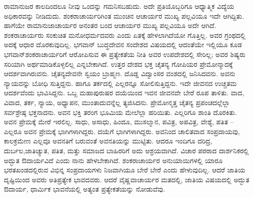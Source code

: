ರಾಮಾನುಜರ ಕಾಲದಿಂದಲೂ ನೀವು ಒಂದನ್ನು ಗಮನಿಸಬಹುದು. ಅದೇ ಪ್ರತಿಯೊಬ್ಬರಿಗೂ ಆಧ್ಯಾತ್ಮಿಕ ವಿದ್ಯೆಯ ಅಧಿಕಾರವನ್ನು ನೀಡಿದುದು. ಶಂಕರಾಚಾರ್ಯರಿಗಿಂತ ಮುಂಚಿನ ಆಚಾರ್ಯರ ಮುಖ್ಯ ಪಲ್ಲವಿಯೂ ಇದೇ ಆಗಿದ್ದಿತು. ಹಾಗೆಯೇ ರಾಮಾನುಜಾಚಾರ್ಯರ ಅನಂತರ ಬಂದ ಆಚಾರ್ಯರ ಮುಖ್ಯ ಪಲ್ಲವಿಯೂ ಅದೇ ಆಗಿದೆ. ಶಂಕರಾಚಾರ್ಯರು ಸಂಕುಚಿತ ಮನೋಧರ್ಮದವರು ಎಂದು ಏತಕ್ಕೆ ಹೇಳಲಾಗಿದೆಯೋ ಗೊತ್ತಿಲ್ಲ. ಅವರ ಗ್ರಂಥದಲ್ಲಿ ಅದಕ್ಕೆ ಆಧಾರ ದೊರಕುವುದಿಲ್ಲ. ಭಗವಾನ್​ ಬುದ್ಧದೇವನ ಸಂದೇಶದ ವಿಷಯದಲ್ಲಿ ಆದಂತೆಯೇ ಇಲ್ಲಿಯೂ ಕೂಡ ಭಗವಾನ್​ ಶಂಕರಾಚಾರ್ಯರಿಗೆ ಆರೋಪಿಸುವ ಈ ಪ್ರತ್ಯೇಕತೆಯ ನೀತಿ ಅವರ ಉಪದೇಶದಲ್ಲಿ ಸೇರಿಲ್ಲ; ಅವರ ಶಿಷ್ಯರು ಸರಿಯಾಗಿ ಅರ್ಥಮಾಡಿಕೊಳ್ಳಲಿಲ್ಲ ಎನ್ನಬೇಕಾಗಿದೆ. ಉತ್ತರ ದೇಶದ ಭಕ್ತ ಚೈತನ್ಯ ಗೋಪಿಯರ ಪ್ರೇಮೋನ್ಮಾದಕ್ಕೆ ಆದರ್ಶವಾಗಿರುವನು. ಚೈತನ್ಯದೇವನೇ ಸ್ವಯಂ ಬ್ರಾಹ್ಮಣ. ದೊಡ್ಡ ವಿದ್ವಾಂಸರ ವಂಶದಲ್ಲಿ ಜನಿಸಿದವನು. ಅವನು ನ್ಯಾಯವನ್ನು ಬೋಧಿ ಸುತ್ತಿದ್ದನು. ಹಾಗೂ ತರ್ಕದಲ್ಲಿ ಎಲ್ಲರನ್ನೂ ಸೋಲಿಸುತ್ತಿದ್ದನು. ಇದೇ ಜೀವನದ ಉಚ್ಚತಮ ಆದರ್ಶವೆಂದು ಭಾವಿಸಿದ್ದನು. ಒಬ್ಬ ಮಹಾಪುರುಷರ ದಯೆಯಿಂದ ಇವನ ಜೀವನವೇ ಬೇರೆ ರೂಪ ತಾಳಿತು. ವಾದ, ವಿವಾದ, ತರ್ಕ, ನ್ಯಾಯ, ಅಧ್ಯಾಪನ, ಮುಂತಾದುವನ್ನೆಲ್ಲ ತ್ಯಜಿಸಿದನು. ಪ್ರೇಮೋನ್ಮತ್ತ ಚೈತನ್ಯ ಪ್ರಪಂಚದಲ್ಲೆಲ್ಲಾ ಸರ್ವಶ್ರೇಷ್ಠ ಭಕ್ತನಾದನು. ಅವನ ಭಕ್ತಿ ತರಂಗ ಭೂಮಿಯ ಮೇಲೆಲ್ಲಾ ಹರಿಯಿತು. ಎಲ್ಲರಿಗೂ ಶಾಂತಿ ದೊರಕಿತು. ಅವನ ಪ್ರೇಮಕ್ಕೆ ಮೇರೆ ಇರಲಿಲ್ಲ. ಸಾಧು, ಅಸಾಧು, ಹಿಂದೂ, ಮುಸಲ್ಮಾನ, ಪವಿತ್ರ, ಅಪವಿತ್ರ, ವೇಶ್ಯೆ, ಪತಿತ – ಎಲ್ಲರೂ ಅವನ ಪ್ರೇಮಕ್ಕೆ ಭಾಗಿಗಳಾಗಿದ್ದರು. ದಯೆಗೆ ಭಾಗಿಗಳಾಗಿದ್ದರು. ಅವನಿಂದ ಚಾಲಿತವಾದ ಸಂಪ್ರದಾಯವು, ಕಾಲಕ್ರಮೇಣ ಎಲ್ಲವೂ ಅವನತಿಗೆ ಬರುವಂತೆ ಅವನತಿಯನ್ನು ಮುಟ್ಟಿತು. ಆದರೂ ಇಂದಿಗೂ ದರಿದ್ರ, ದುರ್ಬಲ,\break ಜಾತಿಚ್ಯುತ, ಪತಿತ, ಮತ್ತು ಸಮಾಜದ ಬಾಹಿರರಿಗೆ ಅದು ಆಶ್ರಯವಾಗಿದೆ. ವಿಚಾರ ಪರರಾದ ದಾರ್ಶನಿಕರಲ್ಲಿ ಅದ್ಭುತ ಔದಾರ್ಯವಿದೆ ಎಂದು ನಾನು ಹೇಳಬೇಕಾಗಿದೆ. ಶಂಕರಾಚಾರ್ಯರ ಅನುಯಾಯಿಗಳಲ್ಲಿ ಯಾರೂ ಭರತಖಂಡದಲ್ಲಿರುವ ವಿಭಿನ್ನ ಸಂಪ್ರದಾಯಗಳು ನಿಜವಾಗಿಯೂ ಬೇರೆ ಬೇರೆ ಎಂದು ಹೇಳುವುದಿಲ್ಲ. ಆದರೆ ಜಾತಿಯ ದೃಷ್ಟಿಯಿಂದ ಅವರು ಅತಿಪ್ರತ್ಯೇಕ ಭಾವದವರು. ಆದರೆ ವೈಷ್ಣವಾಚಾರ್ಯರ ಮತದಲ್ಲಿ, ಜಾತಿಯ ವಿಷಯದಲ್ಲಿ ಅದ್ಭುತ ಔದಾರ್ಯ, ಧಾರ್ಮಿಕ ಭಾವನೆಯಲ್ಲಿ ಅತ್ಯಂತ ಪ್ರತ್ಯೇಕತೆಯನ್ನು ನೋಡುವೆವು. 

